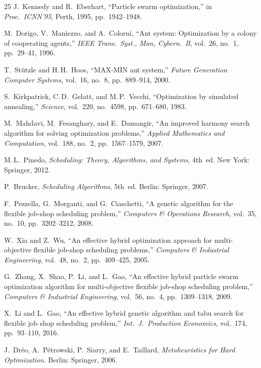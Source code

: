 \documentclass[conference]{IEEEtran}
\begin{document}
\begin{thebibliography}{25}
J.~Kennedy and R.~Eberhart,
``Particle swarm optimization,''
in \textit{Proc.\ ICNN'95}, Perth, 1995, pp.~1942--1948.

M.~Dorigo, V.~Maniezzo, and A.~Colorni,
``Ant system: Optimization by a colony of cooperating agents,''
\textit{IEEE Trans.\ Syst., Man, Cybern.\ B}, vol.~26, no.~1,
pp.~29--41, 1996.

T.~St\"utzle and H.\,H.~Hoos,
``MAX-MIN ant system,''
\textit{Future Generation Computer Systems}, vol.~16, no.~8,
pp.~889--914, 2000.

S.~Kirkpatrick, C.\,D.~Gelatt, and M.\,P.~Vecchi,
``Optimization by simulated annealing,''
\textit{Science}, vol.~220, no.~4598, pp.~671--680, 1983.

M.~Mahdavi, M.~Fesanghary, and E.~Damangir,
``An improved harmony search algorithm for solving optimization
problems,''
\textit{Applied Mathematics and Computation}, vol.~188, no.~2,
pp.~1567--1579, 2007.

M.\,L.~Pinedo,
\textit{Scheduling: Theory, Algorithms, and Systems}, 4th~ed.
New York: Springer, 2012.

P.~Brucker,
\textit{Scheduling Algorithms}, 5th~ed.
Berlin: Springer, 2007.

F.~Pezzella, G.~Morganti, and G.~Ciaschetti,
``A genetic algorithm for the flexible job-shop scheduling problem,''
\textit{Computers \& Operations Research}, vol.~35, no.~10,
pp.~3202--3212, 2008.

W.~Xia and Z.~Wu,
``An effective hybrid optimization approach for multi-objective
flexible job-shop scheduling problems,''
\textit{Computers \& Industrial Engineering}, vol.~48, no.~2,
pp.~409--425, 2005.

G.~Zhang, X.~Shao, P.~Li, and L.~Gao,
``An effective hybrid particle swarm optimization algorithm for
multi-objective flexible job-shop scheduling problem,''
\textit{Computers \& Industrial Engineering}, vol.~56, no.~4,
pp.~1309--1318, 2009.

X.~Li and L.~Gao,
``An effective hybrid genetic algorithm and tabu search for flexible
job shop scheduling problem,''
\textit{Int.\ J.\ Production Economics}, vol.~174,
pp.~93--110, 2016.

J.~Dr\'eo, A.~P\'etrowski, P.~Siarry, and E.~Taillard,
\textit{Metaheuristics for Hard Optimization}.
Berlin: Springer, 2006.


\end{thebibliography}
\end{document}
